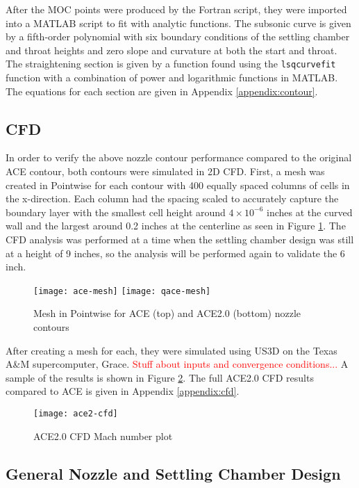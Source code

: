 After the MOC points were produced by the Fortran script, they were imported into a MATLAB script to fit with analytic functions. The subsonic curve is given by a fifth-order polynomial with six boundary conditions of the settling chamber and throat heights and zero slope and curvature at both the start and throat. The straightening section is given by a function found using the \texttt{lsqcurvefit} function with a combination of power and logarithmic functions in MATLAB. The equations for each section are given in Appendix \ref{appendix:contour}.

\subsection{CFD}

In order to verify the above nozzle contour performance compared to the original ACE contour, both contours were simulated in 2D CFD. First, a mesh was created in Pointwise for each contour with 400 equally spaced columns of cells in the x-direction. Each column had the spacing scaled to accurately capture the boundary layer with the smallest cell height around $4 \times 10^{-6}$ inches at the curved wall and the largest around 0.2 inches at the centerline as seen in Figure \ref{fig:mesh}. The CFD analysis was performed at a time when the settling chamber design was still at a height of 9 inches, so the analysis will be performed again to validate the 6 inch.

\begin{figure}[ht!]
    \centering
    \texttt{[image: ace-mesh]}
    \texttt{[image: qace-mesh]}
    \caption{Mesh in Pointwise for ACE (top) and ACE2.0 (bottom) nozzle contours}
    \label{fig:mesh}
\end{figure}

After creating a mesh for each, they were simulated using US3D on the Texas A\&M supercomputer, Grace. \textcolor{red}{Stuff about inputs and convergence conditions...} A sample of the results is shown in Figure \ref{fig:ace2-cfd}. The full ACE2.0 CFD results compared to ACE is given in Appendix \ref{appendix:cfd}.

\begin{figure}[ht!]
    \centering
    \texttt{[image: ace2-cfd]}
    \caption{ACE2.0 CFD Mach number plot}
    \label{fig:ace2-cfd}
\end{figure}

\subsection{General Nozzle and Settling Chamber Design}

